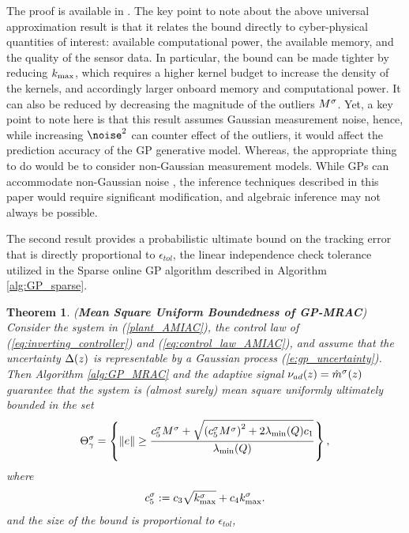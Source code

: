 \documentclass[letterpaper,12pt,peerreviewca,draftcls]{IEEEtran}
\newtheorem{theorem}{Theorem}%
\begin{document}
The proof is available in \cite{Chowdhary13_TNN}. The key point to note about the above universal approximation result is that it relates the bound directly to cyber-physical quantities of interest: available computational power, the available memory, and the quality of the sensor data. In particular, the bound can be made tighter by reducing $k_{\max}$, which requires a higher kernel budget to increase the density of the kernels, and accordingly larger onboard memory and computational power. It can also be reduced by decreasing the magnitude of the outliers $M^{\sigma}$. Yet, a key point to note here is that this result assumes Gaussian measurement noise, hence, while increasing $\noise^2$ can counter effect of the outliers, it would affect the prediction accuracy of the GP generative model. Whereas, the appropriate thing to do would be to consider non-Gaussian measurement models. While GPs can accommodate non-Gaussian noise \cite{chan2011generalized,jylanki2011robust,opper2009variational}, the inference techniques described in this paper would require significant modification, and algebraic inference may not always be possible. %

The second result provides a probabilistic ultimate bound on the tracking error that is directly proportional to $\epsilon_{tol}$, the linear independence check tolerance utilized in the Sparse online GP algorithm described in Algorithm \ref{alg:GP_sparse}.

\begin{theorem}\label{th:gp_mrac}
(\textbf{Mean Square Uniform Boundedness of GP-MRAC}\cite{Chowdhary13_TNN})
  Consider the system in (\ref{plant_AMIAC}), the control law of (\ref{eq:inverting_controller})
  and (\ref{eq:control_law_AMIAC}), and assume that the uncertainty $\Delta(z)$
  is representable by a Gaussian process (\ref{e:gp_uncertainty}). %
   Then Algorithm
  \ref{alg:GP_MRAC} and the adaptive signal $\nu_{ad}(z)=\hat{m}^{\sigma}
  (z)$ guarantee that the system is (almost surely) mean square uniformly ultimately bounded in the set
     \begin{equation}\label{gp_lyapunov_set}
     \Theta_\gamma^{\sigma}=\left\{\|e\|\geq \frac{c_5^{\sigma}M^{\sigma} +
   \sqrt{\left(c_5^{\sigma}M^{\sigma}\right)^2+2\lambda_{\min}(Q)c_1}}{\lambda_{\min}(Q)}\right\},
   \end{equation}
   where  \begin{align}
    c_5^{\sigma} := c_3\sqrt{k_{\max}^{\sigma}} + c_4k_{\max}^{\sigma}.
   \end{align}
   and the size of the bound is proportional to  $\epsilon_{tol}$,
\end{theorem}
\end{document}
